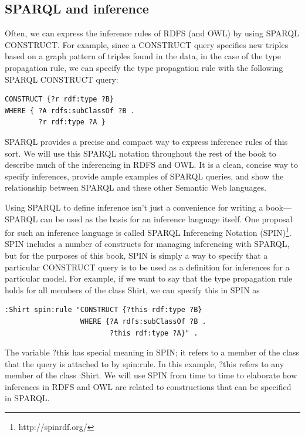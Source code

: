 \subsection{SPARQL and inference}

Often, we can express the inference rules of RDFS (and OWL) by using
SPARQL CONSTRUCT. For example, since a CONSTRUCT query specifies new
triples based on a graph pattern of triples found in
the data, in the case of the type propagation rule, we can specify the
type propagation rule with the following SPARQL CONSTRUCT query:

\begin{lstlisting}
CONSTRUCT {?r rdf:type ?B}
WHERE { ?A rdfs:subClassOf ?B .
        ?r rdf:type ?A }
\end{lstlisting}

SPARQL provides a precise and compact way to express inference rules of
this sort. We will use this SPARQL notation throughout the rest of the
book to describe much of the inferencing in RDFS and OWL. It is a clean,
concise way to specify inferences, provide ample examples of SPARQL
queries, and show the relationship between SPARQL and these other
Semantic Web languages.

Using SPARQL to define inference isn't just a convenience for writing a
book---SPARQL can be used as the basis for an inference language itself.
One proposal for such an inference language is called SPARQL Inferencing
Notation (SPIN)\footnote{http://spinrdf.org/}. SPIN includes a number of constructs for managing
inferencing with SPARQL, but for the purposes of this book, SPIN is
simply a way to specify that a particular CONSTRUCT query is to be used
as a definition for inferences for a particular model. For example, if
we want to say that the type propagation rule holds for all members of
the class Shirt, we can specify this in SPIN as

\begin{lstlisting}
:Shirt spin:rule "CONSTRUCT {?this rdf:type ?B}
                  WHERE {?A rdfs:subClassOf ?B .
                         ?this rdf:type ?A}" .
\end{lstlisting}

The variable ?this has special meaning in SPIN; it refers to a member of
the class that the query is attached to by spin:rule. In this example,
?this refers to any member of the class :Shirt. We will use SPIN from
time to time to elaborate how inferences in RDFS and OWL are related to
constructions that can be specified in SPARQL.

